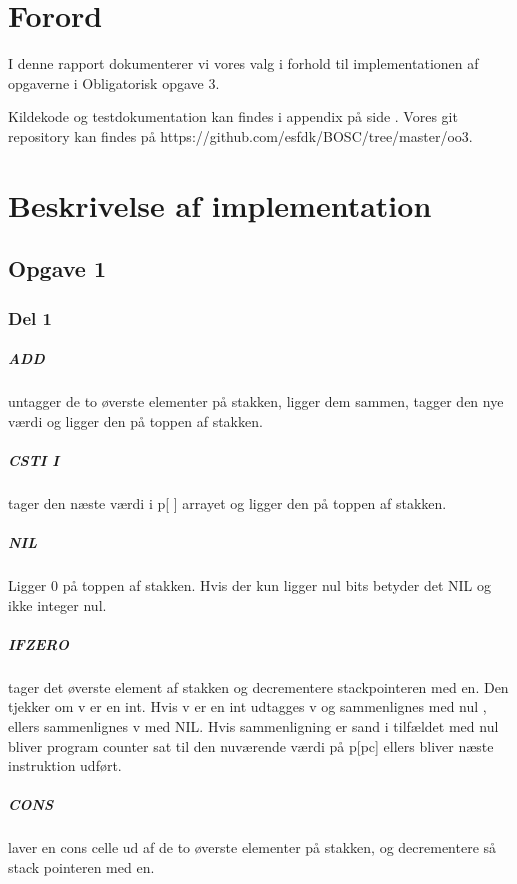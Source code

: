 \chapter{Forord}
I denne rapport dokumenterer vi vores valg i forhold til implementationen af opgaverne i Obligatorisk opgave 3.

Kildekode og testdokumentation kan findes i appendix på side \pageref{Appendix}. Vores git repository kan findes på https://github.com/esfdk/BOSC/tree/master/oo3.

\chapter{Beskrivelse af implementation}
\section{Opgave 1}
\label{O1}
\subsection{Del 1}
\label{O1_1}
	\paragraph{ADD} untagger de to øverste elementer på stakken, ligger dem sammen, tagger den nye værdi og ligger den på toppen af stakken.
	\paragraph{CSTI I} tager den næste værdi i p[ ] arrayet og ligger den på toppen af stakken.
	\paragraph{NIL} Ligger 0 på toppen af stakken. Hvis der kun ligger nul bits betyder det NIL og ikke integer nul.
	\paragraph{IFZERO} tager det øverste element af stakken og decrementere stackpointeren med en. Den tjekker om v er en int. Hvis v er en int udtagges v og sammenlignes med nul , ellers sammenlignes v med NIL. Hvis sammenligning er sand i tilfældet med nul bliver program counter sat til den nuværende værdi på p[pc] ellers bliver næste instruktion udført.
	\paragraph{CONS} laver en cons celle ud af de to øverste elementer på stakken, og decrementere så stack pointeren med en.
